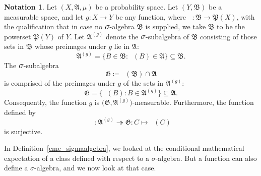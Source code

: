 \documentclass[
twoside=true,
paper=letter,
fontsize=9pt,
pagesize=auto,
leqno,
openany,
headsepline,
overfullrule,
]{scrbook}
\theoremstyle{plain}
\theoremstyle{plain}
\theoremstyle{definition}
\newtheorem{notn}[thm]{Notation}
\theoremstyle{bfnoteitalic}
\theoremstyle{bfnoteroman}
\newcommand{\sigalg}[1]{\mathfrak{#1}}
\newcommand{\definedby}{\coloneqq}
\newcommand{\textsigma}{\hbox{\large{$\sigma$}}\kern-1pt}
\newcommand{\preimage}[1]{\mathop{#1^{\leftarrow}}}
\newcommand{\meets}{\cap}
\newcommand{\sigmaalgebra}{\sigalg{A}}
\newcommand{\sigmaalgebraii}{\sigalg{B}}
\newcommand{\powerset}{\mathfrak{P}}
\newcommand{\functionii}{g}
\newcommand{\measurespace}{X}
\newcommand{\measurespaceii}{Y}
\newcommand{\measure}{\mu}
\begin{document}
\begin{notn}
Let $(\measurespace, \sigmaalgebra,\measure)$ be a probability space.
Let $(\measurespaceii, \sigmaalgebraii)$ be a measurable space, and let $\functionii:\measurespace\to\measurespaceii$ be any function, where $\preimage{\functionii}:\sigmaalgebraii\to\powerset(\measurespace)$,
with the qualification that in case no $\textsigma$-algebra $\sigmaalgebraii$ is supplied, we take $\sigmaalgebraii$ to be the powerset $\powerset(\measurespaceii)$ of $\measurespaceii$. 
Let $\sigmaalgebra^{(\functionii)}$ denote the $\textsigma$-subalgebra of $\sigmaalgebraii$ consisting of those sets in $\sigmaalgebraii$ whose preimages under $\functionii$ lie in $\sigmaalgebra$:
\[
\sigmaalgebra^{(\functionii)}
=
\{ B\in \sigmaalgebraii : \preimage{\functionii}(B)\in \sigmaalgebra \} 
\subseteq \sigmaalgebraii.
\]
The $\textsigma$-subalgebra
\[
\sigalg{G}\definedby
\preimage{\functionii}(\sigmaalgebraii)\meets\sigmaalgebra
\]
is comprised of the preimages under $\functionii$ of the sets in $\sigmaalgebra^{(\functionii)}$:
\[
\sigalg{G}
=
\bigl\{ \preimage{\functionii}(B) : B \in \sigmaalgebra^{(\functionii)} \bigr\} 
\subseteq \sigmaalgebra.
\]
Consequently, the function $\functionii$ is
$\bigl(\sigalg{G}, \sigmaalgebra^{(\functionii)}\bigr)$\hyp{}measurable. Furthermore, the function defined by
\[
\preimage{\functionii}:\sigmaalgebra^{(\functionii)} 
\twoheadrightarrow
\sigalg{G}:
C \mapsto \preimage{\functionii}(C)
\]
is surjective.
\end{notn}

In Definition~\ref{cme_sigmaalgebra}, we looked at the conditional mathematical expectation of a class defined with respect to a \textsigma\hyp{}algebra.  But a function can also define a
\textsigma\hyp{}algebra, and we now look at that case.
\end{document}
